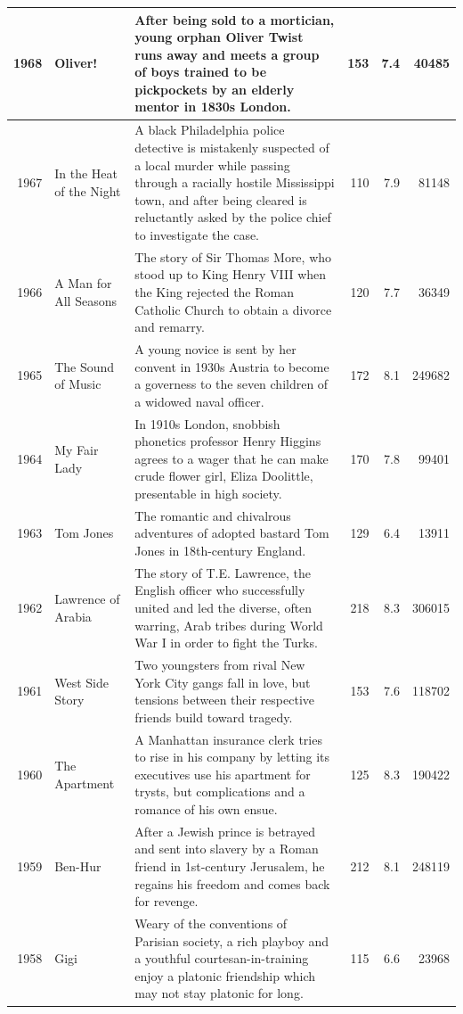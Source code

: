 \documentclass[
]{book}
\begin{document}
\begin{tabular}{r|l|l|r|r|r}
\hline
1968 & Oliver! & After being sold to a mortician, young orphan Oliver Twist runs away and meets a group of boys trained to be pickpockets by an elderly mentor in 1830s London. & 153 & 7.4 & 40485\\
\hline
1967 & In the Heat of the Night & A black Philadelphia police detective is mistakenly suspected of a local murder while passing through a racially hostile Mississippi town, and after being cleared is reluctantly asked by the police chief to investigate the case. & 110 & 7.9 & 81148\\
\hline
1966 & A Man for All Seasons & The story of Sir Thomas More, who stood up to King Henry VIII when the King rejected the Roman Catholic Church to obtain a divorce and remarry. & 120 & 7.7 & 36349\\
\hline
1965 & The Sound of Music & A young novice is sent by her convent in 1930s Austria to become a governess to the seven children of a widowed naval officer. & 172 & 8.1 & 249682\\
\hline
1964 & My Fair Lady & In 1910s London, snobbish phonetics professor Henry Higgins agrees to a wager that he can make crude flower girl, Eliza Doolittle, presentable in high society. & 170 & 7.8 & 99401\\
\hline
1963 & Tom Jones & The romantic and chivalrous adventures of adopted bastard Tom Jones in 18th-century England. & 129 & 6.4 & 13911\\
\hline
1962 & Lawrence of Arabia & The story of T.E. Lawrence, the English officer who successfully united and led the diverse, often warring, Arab tribes during World War I in order to fight the Turks. & 218 & 8.3 & 306015\\
\hline
1961 & West Side Story & Two youngsters from rival New York City gangs fall in love, but tensions between their respective friends build toward tragedy. & 153 & 7.6 & 118702\\
\hline
1960 & The Apartment & A Manhattan insurance clerk tries to rise in his company by letting its executives use his apartment for trysts, but complications and a romance of his own ensue. & 125 & 8.3 & 190422\\
\hline
1959 & Ben-Hur & After a Jewish prince is betrayed and sent into slavery by a Roman friend in 1st-century Jerusalem, he regains his freedom and comes back for revenge. & 212 & 8.1 & 248119\\
\hline
1958 & Gigi & Weary of the conventions of Parisian society, a rich playboy and a youthful courtesan-in-training enjoy a platonic friendship which may not stay platonic for long. & 115 & 6.6 & 23968\\

\end{tabular}
\end{document}
